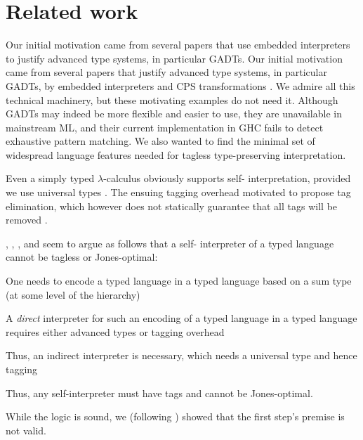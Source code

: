 \section{Related work}\label{related}

\ifshort
Our initial motivation came from several papers 
\citep{WalidICFP02,taha-tag,xi-guarded,peyton-jones-simple}
that use embedded interpreters to justify advanced
type systems, in particular GADTs.
\else
Our initial motivation came from several papers that justify advanced
type systems, in particular GADTs, by embedded interpreters
\citep{WalidICFP02,taha-tag,xi-guarded,peyton-jones-simple} and
CPS transformations \citep{Guillemette-Monier-PLPV,shao-type-toplas,chen-typeful}.
\fi
We admire all this technical machinery, but
these motivating examples do not need it.
Although GADTs may indeed be more flexible and easier to use, they are
unavailable in mainstream ML, and their current implementation in GHC fails to
detect exhaustive pattern matching.  We also wanted to find the minimal
set of widespread language features needed for tagless
type-preserving interpretation.

Even a simply typed $\lambda$-calculus obviously supports self\hyp
interpretation, provided we use universal types \citep{taha-tag}.  The
ensuing tagging overhead motivated \citet{taha-tag} to propose tag
elimination, which however does not statically guarantee that all tags
will be removed \citep{WalidICFP02}.

, \citet{taha-tag}, \citet{xi-guarded}, and
\citet{peyton-jones-simple} seem to argue as follows that a self\hyp
interpreter of a typed language cannot be tagless or Jones\hyp optimal:
\begin{shortlist}
\item One needs to encode a typed language in a typed language based on
a sum type (at some level of the hierarchy)\\
\item A \emph{direct} interpreter 
for such an encoding of a typed language
in a typed language requires either
advanced types or tagging overhead\\
\item Thus, an indirect interpreter is necessary, which needs a universal
  type and hence tagging\ifshort\else\\
\item Thus, any self-interpreter must have tags and cannot be 
  Jones-optimal\fi.
\end{shortlist}
While the logic is sound, we (following \citet{yang-encoding}) showed that the
first step's premise is not valid.

